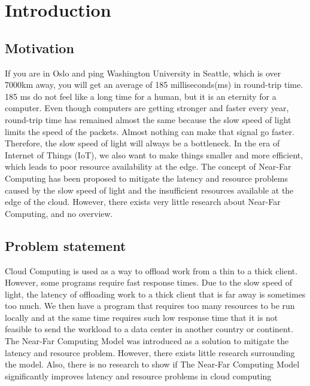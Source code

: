 \chapter{Introduction}

\section{Motivation}
If you are in Oslo and ping Washington University in Seattle, which is over 7000km away,  you will get an average of 185 milliseconds(ms) in round-trip time. 185 ms do not feel like a long time for a human, but it is an eternity for a computer. Even though computers are getting stronger and faster every year, round-trip time has remained almost the same because the slow speed of light limits the speed of the packets. Almost nothing can make that signal go faster. Therefore, the slow speed of light will always be a bottleneck. In the era of Internet of Things (IoT), we also want to make things smaller and more efficient, which leads to poor resource availability at the edge. The concept of Near-Far Computing has been proposed to mitigate the latency and resource problems caused by the slow speed of light and the insufficient resources available at the edge of the cloud. However, there exists very little research about Near-Far Computing, and no overview.



\section{Problem statement}         %
Cloud Computing is used as a way to offload work from a thin to a thick client. However, some programs require fast response times. Due to the slow speed of light, the latency of offloading work to a thick client that is far away is sometimes too much. We then have a program that requires too many resources to be run locally and at the same time requires such low response time that it is not feasible to send the workload to a data center in another country or continent. The Near-Far Computing Model was introduced as a solution to mitigate the latency and resource problem. However, there exists little research surrounding the model. Also, there is no research to show if The Near-Far Computing Model significantly improves latency and resource problems in cloud computing


